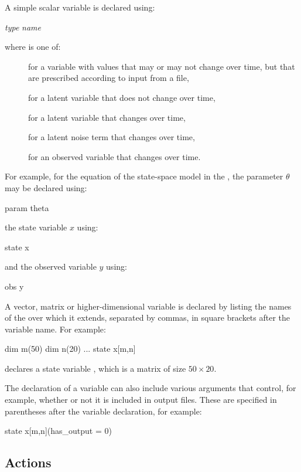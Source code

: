 A simple scalar variable is declared using:
\begin{bicode}
\emph{type} \emph{name}
\end{bicode}
where  is one of:
\begin{description}
\item[] for a variable with values that may or may
  not change over time, but that are prescribed according to input from a
  file,
\item[] for a latent variable that does not change over time,
\item[] for a latent variable that changes over time,
\item[] for a latent noise term that changes over time,
\item[] for an observed variable that changes over time.
\end{description}
For example, for the equation of the state-space model in the
, the parameter $\theta$ may be declared
using:
\begin{bicode}
param theta
\end{bicode}
the state variable $x$ using:
\begin{bicode}
state x
\end{bicode}
and the observed variable $y$ using:
\begin{bicode}
obs y
\end{bicode}

A vector, matrix or
higher-dimensional variable is declared by listing
the names of the  over which it extends,
separated by commas, in square brackets after the variable name. For example:
\begin{bicode}
dim m(50)
dim n(20)
...
state x[m,n]
\end{bicode}
declares a state variable , which is a matrix of size
$50 \times 20$.

The declaration of a variable can also include various arguments that control,
for example, whether or not it is included in output files. These are
specified in parentheses after the variable declaration, for example:
\begin{bicode}
state x[m,n](has_output = 0)
\end{bicode}

\subsection{Actions\label{Actions}}

